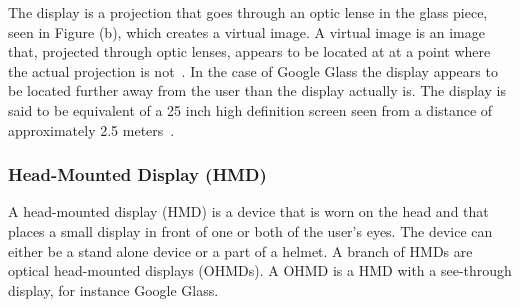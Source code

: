 The display is a projection that goes through an optic lense in the glass piece, seen in Figure \label{GoogleGlassHardware} (b), which creates a virtual image. A virtual image is an image that, projected through optic lenses, appears to be located at at a point where the actual projection is not~\cite{virtualImageWiki}. In the case of Google Glass the display appears to be located further away from the user than the display actually is. The display is said to be equivalent of a 25 inch high definition screen seen from a distance of approximately 2.5 meters~\cite{GlassSpecs}.

%
%
%
%
%
%
%
%	
%	
%	
%
%
%
%
%
%
%
%
\subsubsection{Head-Mounted Display (HMD)}
\label{subsubsec:hmd}
A head-mounted display (HMD)\cite{hmdWiki} is a device that is worn on the head and that places a small display in front of one or both of the user's eyes. The device can either be a stand alone device or a part of a helmet. A branch of HMDs are optical head-mounted displays (OHMDs)\cite{ohmdWiki}. A OHMD is a HMD with a see-through display, for instance Google Glass.

